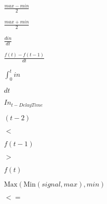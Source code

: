 \documentclass{article}
\begin{document}
$ \frac{max - min}{2}$
\pagebreak

$ \frac{max + min}{2}$
\pagebreak

$ \frac{din}{dt} $
\pagebreak

$ \frac{f(t)-f(t-1)}{dt} $
\pagebreak

$ \int_0^t in$
\pagebreak

$dt $
\pagebreak

$In_{t-DelayTime}$
\pagebreak

$(t-2)$
\pagebreak

$<$
\pagebreak

$f(t-1)$
\pagebreak

$>$
\pagebreak

$f(t)$
\pagebreak

$ \mbox{Max}(\mbox{Min}(signal, max), min)$
\pagebreak

$<=$
\pagebreak
\end{document}
